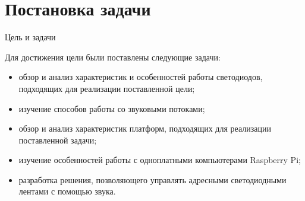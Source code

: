 \section{Постановка задачи}
\begin{frame}{Цель и задачи}

Для достижения цели были поставлены следующие задачи:

\begin{itemize}
  \item обзор и анализ характеристик и особенностей работы светодиодов, подходящих для реализации поставленной цели;
  \item изучение способов работы со звуковыми потоками;
  \item обзор и анализ характеристик платформ, подходящих для реализации поставленной задачи;
  \item изучение особенностей работы с одноплатными компьютерами Raspberry Pi;
  \item разработка решения, позволяющего управлять адресными светодиодными лентами с помощью звука.
\end{itemize}

\end{frame}

